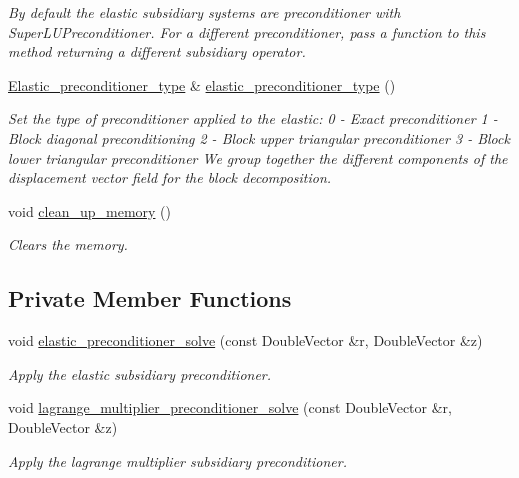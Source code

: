 \begin{DoxyCompactItemize}
\begin{DoxyCompactList}\small\item\em By default the elastic subsidiary systems are preconditioner with Super\+L\+U\+Preconditioner. For a different preconditioner, pass a function to this method returning a different subsidiary operator. \end{DoxyCompactList}\item 
\hyperlink{classoomph_1_1PseudoElasticPreconditionerOld_a6748360e3e2fbd4766d837a520dadfd0}{Elastic\+\_\+preconditioner\+\_\+type} \& \hyperlink{classoomph_1_1PseudoElasticPreconditionerOld_a9edf6f556251ea6ca1b15baf3f6b0425}{elastic\+\_\+preconditioner\+\_\+type} ()
\begin{DoxyCompactList}\small\item\em Set the type of preconditioner applied to the elastic\+: 0 -\/ Exact preconditioner 1 -\/ Block diagonal preconditioning 2 -\/ Block upper triangular preconditioner 3 -\/ Block lower triangular preconditioner We group together the different components of the displacement vector field for the block decomposition. \end{DoxyCompactList}\item 
void \hyperlink{classoomph_1_1PseudoElasticPreconditionerOld_acadd6682a6d25534d7e2be1e95c4d0e6}{clean\+\_\+up\+\_\+memory} ()
\begin{DoxyCompactList}\small\item\em Clears the memory. \end{DoxyCompactList}\end{DoxyCompactItemize}
\subsection*{Private Member Functions}
\begin{DoxyCompactItemize}
\item 
void \hyperlink{classoomph_1_1PseudoElasticPreconditionerOld_a5255c2de35cb38cd49e71220e96db22c}{elastic\+\_\+preconditioner\+\_\+solve} (const Double\+Vector \&r, Double\+Vector \&z)
\begin{DoxyCompactList}\small\item\em Apply the elastic subsidiary preconditioner. \end{DoxyCompactList}\item 
void \hyperlink{classoomph_1_1PseudoElasticPreconditionerOld_a02d8d2a2ad34030238f7f65964f91a08}{lagrange\+\_\+multiplier\+\_\+preconditioner\+\_\+solve} (const Double\+Vector \&r, Double\+Vector \&z)
\begin{DoxyCompactList}\small\item\em Apply the lagrange multiplier subsidiary preconditioner. \end{DoxyCompactList}\end{DoxyCompactItemize}
